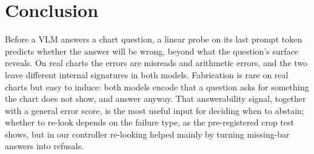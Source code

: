 \section{Conclusion}
\label{sec:conclusion}

Before a VLM answers a chart question, a linear probe on its last prompt token
predicts whether the answer will be wrong, beyond what the question's surface
reveals. On real charts the errors are misreads and arithmetic errors, and the two
leave different internal signatures in both models. Fabrication is rare on real
charts but easy to induce: both models encode that a question asks for something
the chart does not show, and answer anyway. That answerability signal, together
with a general error score, is the most useful input for deciding when to
abstain; whether to re-look depends on the failure type, as the pre-registered
crop test shows, but in our controller re-looking helped mainly by turning
missing-bar answers into refusals.
